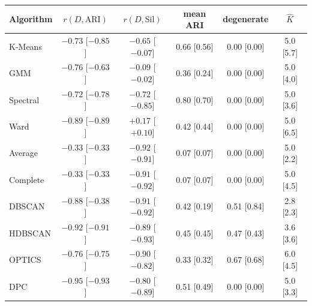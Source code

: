 \begin{tabular}{@{}lccccc@{}}
\toprule
Algorithm & $r(D,\text{ARI})$ & $r(D,\text{Sil})$ & mean ARI & degenerate & $\hat K$ \\
\midrule
K-Means & $-0.73$ [$-0.85$] & $-0.65$ [$-0.07$] & 0.66 [0.56] & 0.00 [0.00] & 5.0 [5.7] \\
GMM & $-0.76$ [$-0.63$] & $-0.09$ [$-0.02$] & 0.36 [0.24] & 0.00 [0.00] & 5.0 [4.0] \\
Spectral & $-0.72$ [$-0.78$] & $-0.72$ [$-0.85$] & 0.80 [0.70] & 0.00 [0.00] & 5.0 [3.6] \\
Ward & $-0.89$ [$-0.89$] & $+0.17$ [$+0.10$] & 0.42 [0.44] & 0.00 [0.00] & 5.0 [6.5] \\
Average & $-0.33$ [$-0.33$] & $-0.92$ [$-0.91$] & 0.07 [0.07] & 0.00 [0.00] & 5.0 [2.2] \\
Complete & $-0.33$ [$-0.33$] & $-0.91$ [$-0.92$] & 0.07 [0.07] & 0.00 [0.00] & 5.0 [4.5] \\
DBSCAN & $-0.88$ [$-0.38$] & $-0.91$ [$-0.92$] & 0.42 [0.19] & 0.51 [0.84] & 2.8 [2.3] \\
HDBSCAN & $-0.92$ [$-0.91$] & $-0.89$ [$-0.93$] & 0.45 [0.45] & 0.47 [0.43] & 3.6 [3.6] \\
OPTICS & $-0.76$ [$-0.75$] & $-0.90$ [$-0.82$] & 0.33 [0.32] & 0.67 [0.68] & 6.0 [4.5] \\
DPC & $-0.95$ [$-0.93$] & $-0.80$ [$-0.89$] & 0.51 [0.49] & 0.00 [0.00] & 5.0 [3.3] \\
\bottomrule
\end{tabular}
